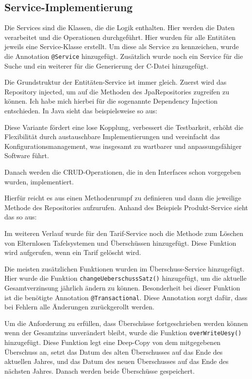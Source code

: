 \subsection{Service-Implementierung}
Die Services sind die Klassen, die die Logik enthalten. Hier werden die Daten verarbeitet und die Operationen durchgeführt.
Hier wurden für alle Entitäten jeweils eine Service-Klasse erstellt. Um diese als Service zu kennzeichen, wurde die Annotation \texttt{@Service} hinzugefügt.
Zusätzlich wurde noch ein Service für die Suche und ein weiterer für die Generierung der C-Datei hinzugefügt.

Die Grundstruktur der Entitäten-Service ist immer gleich. Zuerst wird das Repository injected, um auf die Methoden des JpaRepositories zugreifen zu können. Ich habe mich hierbei für die sogenannte Dependency Injection entschieden.
In Java sieht das beispielsweise so aus:



Diese Variante fördert eine lose Kopplung, verbessert die Testbarkeit, erhöht die Flexibilität durch austauschbare Implementierungen 
und vereinfacht das Konfigurationsmanagement, was insgesamt zu wartbarer und anpassungsfähiger Software führt. \cite{seemann2019dependency}

Danach werden die CRUD-Operationen, die in den Interfaces schon vorgegeben wurden, implementiert.

Hierfür reicht es aus einen Methodenrumpf zu definieren und dann die jeweilige Methode des Repositories aufzurufen.
Anhand des Beispiels Produkt-Service sieht das so aus:



Im weiteren Verlauf wurde für den Tarif-Service noch die Methode zum Löschen von Elternlosen Tafelsystemen und Überschüssen hinzugefügt.
Diese Funktion wird aufgerufen, wenn ein Tarif gelöscht wird.

Die meisten zusätzlichen Funktionen wurden im Überschuss-Service hinzugefügt. Hier wurde die Funktion \texttt{changeUeberschussSatz()} hinzugefügt, um die aktuelle Gesamtverzinsung jährlich 
ändern zu können. Besonderheit bei dieser Funktion ist die benötigte Annotation \texttt{@Transactional}. Diese Annotation sorgt dafür, dass bei Fehlern alle Änderungen zurückgerollt werden.

Um die Anforderung zu erfüllen, dass Überschüsse fortgeschrieben werden können wenn der Gesamtzins unverändert bleibt, wurde die Funktion \texttt{overWriteUesy()} hinzugefügt.
Diese Funktion legt eine Deep-Copy von dem mitgegebenen Überschuss an, setzt das Datum des alten Überschusses auf das Ende des aktuellen Jahres, und das Datum des neuen 
Überschusses auf das Ende des nächsten Jahres. Danach werden beide Überschüsse gespeichert.

